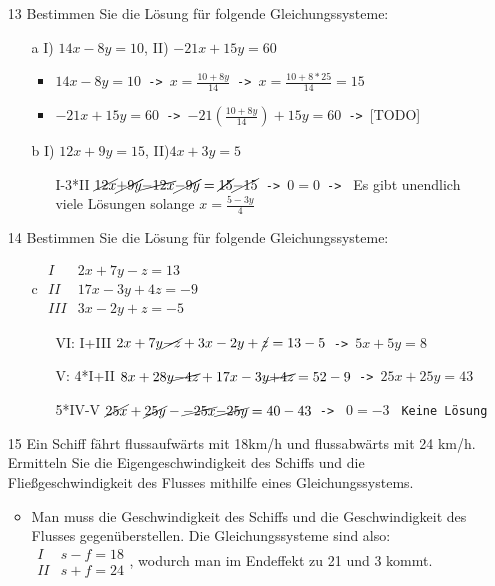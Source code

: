 \documentclass{article}
\begin{document}
\begin{itemize}
\begin{itemize}
		\end{itemize}
		\item[13]{Bestimmen Sie die Lösung für folgende Gleichungssysteme:}
		\begin{itemize}
			\item[a]{I) $14x-8y=10$, II) $-21x+15y=60$}
			\begin{itemize}
				\item{$14x-8y=10$\texttt{ -> }$x=\frac{10+8y}{14}$\texttt{ -> }$x=\frac{10+8*25}{14}=15$}
				\item{$-21x+15y=60$\texttt{ -> }$-21(\frac{10+8y}{14})+15y=60$\texttt{ -> }[TODO]}
			\end{itemize}
			\item[b]{I) $12x+9y=15$, II)$4x+3y=5$}
			\begin{itemize}
				\item[I-3*II]{$\cancel{12x}\cancel{+9y}\cancel{-12x}\cancel{-9y}=\cancel{15}\cancel{-15}$\texttt{ -> }$0=0$\texttt{ -> } Es gibt unendlich viele Lösungen solange $x=\frac{5-3y}{4}$}
			\end{itemize}
		\end{itemize}
		\item[14]{Bestimmen Sie die Lösung für folgende Gleichungssysteme:}
		\begin{itemize}
			\item[c]{$\begin{matrix} I & 2x+7y-z=13 \\ II & 17x-3y+4z=-9 \\ III & 3x-2y+z=-5 \end{matrix}$}
			\begin{itemize}
				\item[VI: I+III]{$2x+7y\cancel{-z}+3x-2y+\cancel{z}=13-5$\texttt{ -> }$5x+5y=8$}
				\item[V: 4*I+II]{$8x+28y\cancel{-4z}+17x-3y\cancel{+4z}=52-9$\texttt{ -> }$25x+25y=43$}
				\item[5*IV-V]{$\cancel{25x}+\cancel{25y}-\cancel{-25x}\cancel{-25y}=40-43$\texttt{ -> } $0=-3$ \texttt{ Keine Lösung}}
			\end{itemize}
		\end{itemize}
		\item[15]{Ein Schiff fährt flussaufwärts mit 18km/h und flussabwärts mit 24 km/h. Ermitteln Sie die Eigengeschwindigkeit des Schiffs und die Fließgeschwindigkeit des Flusses mithilfe eines Gleichungssystems.}
		\begin{itemize}
			\item{Man muss die Geschwindigkeit des Schiffs und die Geschwindigkeit des Flusses gegenüberstellen. Die Gleichungssysteme sind also: $\begin{matrix} I & s-f=18 \\ II & s+f=24 \end{matrix}$, wodurch man im Endeffekt zu 21 und 3 kommt.}

\end{itemize}
\end{itemize}
\end{document}
